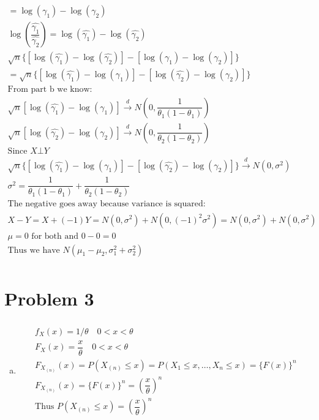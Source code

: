 \documentclass{article}
\newcommand{\cd}{\overset{d}{\to}}
\begin{document}
\begin{flushleft}
\begin{enumerate}[(a)]
\begin{multline*}
=\log(\gamma_1)-\log(\gamma_2)\\
\log\left(\dfrac{\hat{\gamma_1}}{\hat{\gamma_2}}\right)=\log(\hat{\gamma_1})-\log(\hat{\gamma_2})\\
\sqrt{n}\{[\log(\hat{\gamma_1})-\log(\hat{\gamma_2})]-[\log(\gamma_1)-\log(\gamma_2)]\}\\
=\sqrt{n}\{[\log(\hat{\gamma_1})-\log(\gamma_1)]-[\log(\hat{\gamma_2})-\log(\gamma_2)]\}\\
\text{From part b we know:}\\
\sqrt{n}[\log(\hat{\gamma_1})-\log(\gamma_1)]\cd N\left(0,\dfrac{1}{\theta_1(1-\theta_1)}\right)\\
\sqrt{n}[\log(\hat{\gamma_2})-\log(\gamma_2)]\cd N\left(0,\dfrac{1}{\theta_2(1-\theta_2)}\right)\\
\text{Since } X\bot Y\\
\sqrt{n}\{[\log(\hat{\gamma_1})-\log(\gamma_1)]-[\log(\hat{\gamma_2})-\log(\gamma_2)]\}\cd N(0,\sigma^2)\\
\sigma^2=\dfrac{1}{\theta_1(1-\theta_1)}+\dfrac{1}{\theta_2(1-\theta_2)}\\
\text{The negative goes away because variance is squared:}\\
X-Y=X+(-1)Y =N(0,\sigma^2)+N(0,(-1)^2 \sigma^2) =N(0,\sigma^2)+N(0,\sigma^2)\\
\mu=0 \text{ for both and } 0-0=0\\
\text{Thus we have } N(\mu_1-\mu_2,\sigma_1^2+\sigma_2^2)\\
\end{multline*}
	
\end{enumerate}

	\section*{Problem 3}
	
\begin{enumerate}[(a)]
	\item 
\begin{multline*}\\
f_X(x)=1/\theta \quad 0<x<\theta\\
F_X(x)=\dfrac{x}{\theta} \quad 0<x<\theta\\
F_{X_{(n)}}(x)=P(X_{(n)}\leq x)=P(X_1\leq x,\dots,X_n\leq x)=\{F(x)\}^n\\
F_{X_{(n)}}(x)=\{F(x)\}^n=\left(\dfrac{x}{\theta}\right)^n\\
\text{Thus } P(X_{(n)}\leq x)=\left(\dfrac{x}{\theta}\right)^n\\
\end{multline*} 


\end{enumerate}
\end{flushleft}
\end{document}
